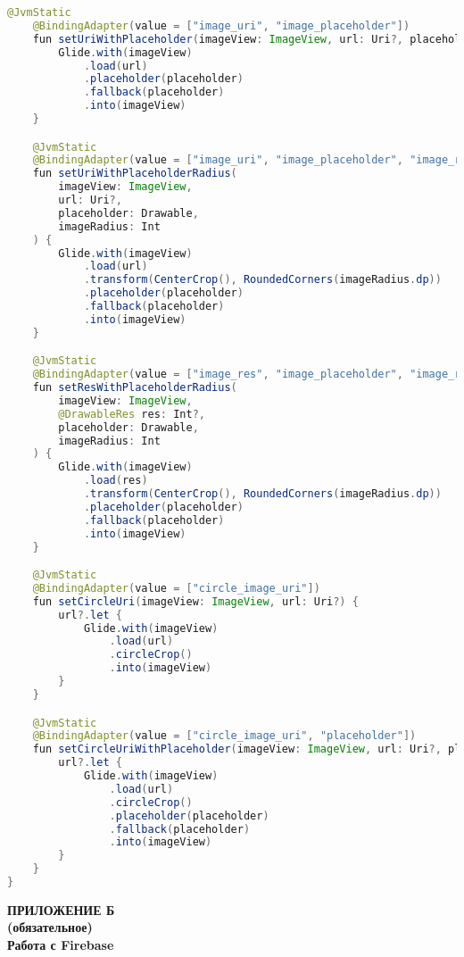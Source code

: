\begin{asection}
\begin{lstlisting}[language=Java,label={lst:add:a_9}, caption={AhriMessagingService}, caption={PreferenceDataSource}]
    @JvmStatic
    @BindingAdapter(value = ["image_uri", "image_placeholder"])
    fun setUriWithPlaceholder(imageView: ImageView, url: Uri?, placeholder: Drawable) {
        Glide.with(imageView)
            .load(url)
            .placeholder(placeholder)
            .fallback(placeholder)
            .into(imageView)
    }

    @JvmStatic
    @BindingAdapter(value = ["image_uri", "image_placeholder", "image_radius"])
    fun setUriWithPlaceholderRadius(
        imageView: ImageView,
        url: Uri?,
        placeholder: Drawable,
        imageRadius: Int
    ) {
        Glide.with(imageView)
            .load(url)
            .transform(CenterCrop(), RoundedCorners(imageRadius.dp))
            .placeholder(placeholder)
            .fallback(placeholder)
            .into(imageView)
    }

    @JvmStatic
    @BindingAdapter(value = ["image_res", "image_placeholder", "image_radius"])
    fun setResWithPlaceholderRadius(
        imageView: ImageView,
        @DrawableRes res: Int?,
        placeholder: Drawable,
        imageRadius: Int
    ) {
        Glide.with(imageView)
            .load(res)
            .transform(CenterCrop(), RoundedCorners(imageRadius.dp))
            .placeholder(placeholder)
            .fallback(placeholder)
            .into(imageView)
    }

    @JvmStatic
    @BindingAdapter(value = ["circle_image_uri"])
    fun setCircleUri(imageView: ImageView, url: Uri?) {
        url?.let {
            Glide.with(imageView)
                .load(url)
                .circleCrop()
                .into(imageView)
        }
    }

    @JvmStatic
    @BindingAdapter(value = ["circle_image_uri", "placeholder"])
    fun setCircleUriWithPlaceholder(imageView: ImageView, url: Uri?, placeholder: Drawable) {
        url?.let {
            Glide.with(imageView)
                .load(url)
                .circleCrop()
                .placeholder(placeholder)
                .fallback(placeholder)
                .into(imageView)
        }
    }
}
\end{lstlisting}
\end{asection}
\newpage
{}
{}

\begin{center}
    \textbf{\MakeUppercase{Приложение Б}\\
    (обязательное)\\
    Работа с Firebase }
\end{center}

